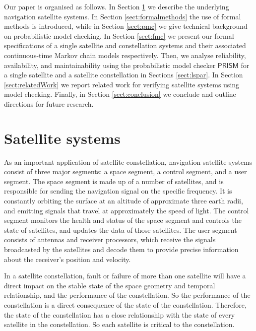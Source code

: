 \documentclass[preprint,12pt]{qrei}
\begin{document}
Our paper is organised as follows. In Section \ref{sect:system} we describe the underlying navigation satellite systems. In Section \ref{sect:formalmethods} the use of formal methods is introduced, while in Section \ref{sect:pmc} we give technical background on probabilistic model checking. In Section \ref{sect:fmc} we present our formal specifications of a single satellite and constellation systems and their associated continuous-time Markov chain models respectively. Then, we analyse reliability, availability, and maintainability using the probabilistic model checker $\mathsf{PRISM}$ for a single satellite and a satellite constellation in Sections \ref{sect:lspar}. In Section \ref{sect:relatedWork} we report related work for verifying satellite systems using model checking. Finally, in Section \ref{sect:conclusion} we conclude and outline directions for future research.



\section{Satellite systems}\label{sect:system}

As an important application of satellite constellation, navigation satellite systems consist of three major segments: a space segment, a control segment, and a user segment. The space segment is made up of a number of satellites, and is responsible for sending the navigation signal on the specific frequency. It is constantly orbiting the surface at an altitude of approximate three earth radii, and emitting signals that travel at approximately the speed of light. The control segment monitors the health and status of the space segment and controls the state of satellites, and updates the data of those satellites. The user segment consists of antennas and receiver processors, which receive the signals broadcasted by the satellites and decode them to provide precise information about the receiver’s position and velocity.

In a satellite constellation, fault or failure of more than one satellite will have a direct impact on the stable state of the space geometry and temporal relationship, and the performance of the constellation. So the performance of the constellation is a direct consequence of the state of the constellation. Therefore, the state of the constellation has a close relationship with the state of every satellite in the constellation. So each satellite is critical to the constellation.
\end{document}
